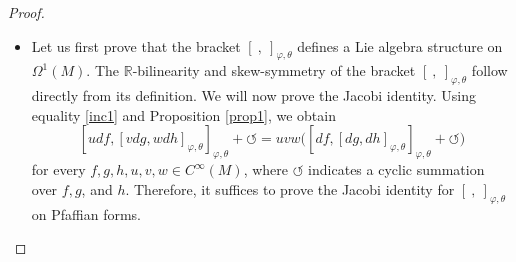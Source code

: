\documentclass[a4paper,10pt]{article}
\numberwithin{equation}{section}
\theoremstyle{plain}
\begin{document}
		\begin{proof}~
			\begin{itemize}
				\item Let us first prove that the bracket $[\ ,\ ]_{\varphi,\theta}$ defines a Lie algebra structure on $\Omega^1(M)$.
				The $\mathbb{R}$-bilinearity and skew-symmetry of the bracket $[\ ,\ ]_{\varphi,\theta}$ follow directly from its definition.
				We will now prove the Jacobi identity. Using equality \eqref{inc1} and Proposition \ref{prop1}, we obtain
				$$
				 [udf,[vdg,wdh]_{\varphi,\theta}]_{\varphi,\theta}+\circlearrowleft=uvw\big([df,[dg,dh]_{\varphi,\theta}]_{\varphi,\theta}+\circlearrowleft\big)
				$$
				for every $f,g,h,u,v,w\in C^\infty(M)$, where $\circlearrowleft$ indicates a cyclic summation over $f, g$, and $h$. Therefore, it suffices to prove the Jacobi identity for $[\ ,\ ]_{\varphi,\theta}$ on Pfaffian forms.
				

\end{itemize}
\end{proof}
\end{document}
